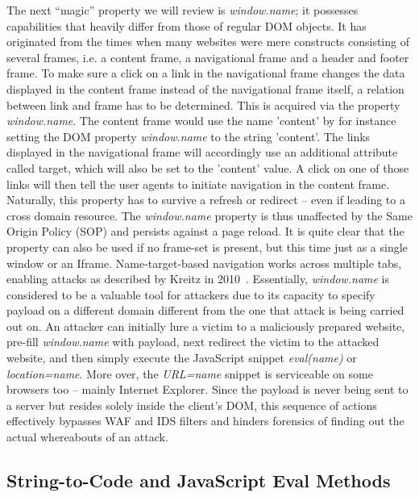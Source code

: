      The next ``magic'' property we will review is \textit{window.name}; it possesses capabilities that heavily differ from those of regular DOM objects. It has originated from the times when many websites were mere constructs consisting of several frames, i.e. a content frame, a navigational frame and a header and footer frame. To make sure a click on a link in the navigational frame changes the data displayed in the content frame instead of the navigational frame itself, a relation between link and frame has to be determined. This is acquired via the property \textit{window.name}. The content frame would use the name 'content' by for instance setting the DOM property \textit{window.name} to the string 'content'. The links displayed in the navigational frame will accordingly use an additional attribute called target, which will also be set to the 'content' value. A click on one of those links will then tell the user agents to initiate navigation in the content frame. Naturally, this property has to survive a refresh or redirect -- even if leading to a cross domain resource. The \textit{window.name} property  is thus unaffected by the Same Origin Policy (SOP) and persists against a page reload. It is quite clear that the property can also be used if no frame-set is present, but this time just as a single window or an Iframe. Name-target-based navigation works across multiple tabs, enabling attacks as described by Kreitz in 2010~\cite{kreitz2011timing}. Essentially, \textit{window.name} is considered to be a valuable tool for attackers due to its capacity to specify payload on a different domain different from the one that attack is being carried out on. An attacker can initially lure a victim to a maliciously prepared website, pre-fill \textit{window.name} with payload, next redirect the victim to the attacked website, and then simply execute the JavaScript snippet \textit{eval(name)} or \textit{location=name}. More over, the \textit{URL=name} snippet is serviceable on some browsers too -- mainly Internet Explorer. Since the payload is never being sent to a server but resides solely inside the client's DOM, this sequence of actions effectively bypasses WAF and IDS filters and hinders forensics of finding out the actual whereabouts of an attack.

    \subsection{String-to-Code and JavaScript Eval Methods}
    \label{subsubsec:6.2.7.string_to_code_and_javascript_eval_methods}


